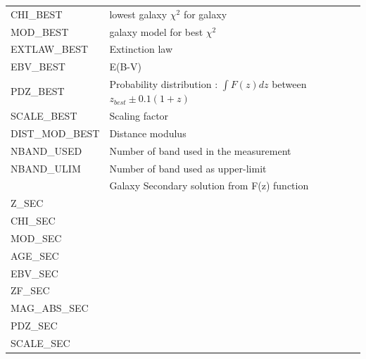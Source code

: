 \documentclass[12pt]{article}
\begin{document}
\begin{tabular}{llll}
CHI\_BEST                &    lowest galaxy  $\chi^2$    for galaxy \\
MOD\_BEST              &    galaxy model  for best $\chi^2$  \\
EXTLAW\_BEST        &   Extinction law   \\
EBV\_BEST               &   E(B-V)   \\
PDZ\_BEST                &  Probability distribution : $\int F(z)dz$ between $z_{best} \pm 0.1(1+z)$  \\
SCALE\_BEST           &   Scaling factor   \\
DIST\_MOD\_BEST   &   Distance modulus   \\
NBAND\_USED          &  Number of band used in the measurement \\
NBAND\_ULIM          &   Number of band used as upper-limit  \\
%
\hline 
        & Galaxy Secondary solution from F(z) function\\  
\hline 
Z\_SEC                  &      \\ 
CHI\_SEC              &      \\ 
MOD\_SEC            &      \\ 
AGE\_SEC             &      \\ 
EBV\_SEC             &       \\ 
ZF\_SEC                &      \\ 
MAG\_ABS\_SEC   &      \\ 
PDZ\_SEC             &      \\ 
SCALE\_SEC         &      \\ 
\hline 
\hline 
\end{tabular}
\end{document}
